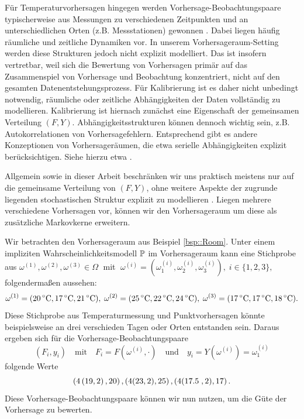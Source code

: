 Für Temperaturvorhersagen hingegen werden Vorhersage-Beobachtungspaare typischerweise aus Messungen zu verschiedenen Zeitpunkten und an unterschiedlichen Orten (z.B. Messstationen) gewonnen \parencite{gneiting2014calibration, vannitsem_statistical_2021}. Dabei liegen häufig räumliche und zeitliche Dynamiken vor. In unserem Vorhersageraum-Setting werden diese Strukturen jedoch nicht explizit modelliert. Das ist insofern vertretbar, weil sich die Bewertung von Vorhersagen primär auf das Zusammenspiel von Vorhersage und Beobachtung konzentriert, nicht auf den gesamten Datenentstehungsprozess. Für Kalibrierung ist es daher nicht unbedingt notwendig, räumliche oder zeitliche Abhängigkeiten der Daten vollständig zu modellieren. Kalibrierung ist hiernach zunächst eine Eigenschaft der gemeinsamen Verteilung  $(F,Y)$. Abhängigkeitsstrukturen können dennoch wichtig sein, z.B. Autokorrelationen von Vorhersagefehlern. Entsprechend gibt es andere Konzeptionen von Vorhersageräumen, die etwa serielle Abhängigkeiten explizit berücksichtigen. Siehe hierzu etwa \textcite[Definition 2.2]{strahl2017cross}. 

Allgemein sowie in dieser Arbeit beschränken wir uns praktisch meistens nur auf die gemeinsame Verteilung von $(F,Y)$, ohne weitere Aspekte der zugrunde liegenden stochastischen Struktur explizit zu modellieren \parencite{gneitingCombining2013}. Liegen mehrere verschiedene Vorhersagen vor, können wir den Vorhersageraum um diese als zusätzliche Markovkerne erweitern.


\begin{bsp}
Wir betrachten den Vorhersageraum aus Beispiel \ref{bsp::Room}. Unter einem impliziten Wahrscheinlichkeitsmodell $\mathbb{P}$ im Vorhersageraum kann eine Stichprobe aus $\omega^{(1)}, \omega^{(2)}, \omega^{(3)} \in \Omega \;$ mit $\;\omega^{(i)} = (\omega_1^{(i)}, \omega_2^{(i)}, \omega_3^{(i)}),\; i \in \{1,2,3\},$ folgendermaßen aussehen:
\[
\omega^{(1)} = (20\,^\circ\mathrm{C}, 17\,^\circ\mathrm{C}, 21\,^\circ\mathrm{C}), 
\;\omega^{(2)} = (25\,^\circ\mathrm{C}, 22\,^\circ\mathrm{C}, 24\,^\circ\mathrm{C}),
\;\omega^{(3)} = (17\,^\circ\mathrm{C}, 17\,^\circ\mathrm{C}, 18\,^\circ\mathrm{C}).
\]
Diese Stichprobe aus Temperaturmessung und Punktvorhersagen könnte beispielsweise an drei verschieden Tagen oder Orten entstanden sein. Daraus ergeben sich für die Vorhersage-Beobachtungspaare
\[
(F_i,y_i) \quad  \text{mit} \quad F_i=F(\omega^{(i)},\cdot)  \quad \text{und} \quad y_i = Y(\omega^{(i)})= \omega_1^{(i)}
\]
folgende Werte
\[
\left(4\left(19,2\right),20\right),
\left(4(23,2),25\right),
\left(4(17.5\;,2),17\right). 
\]
Diese Vorhersage-Beobachtungspaare können wir nun nutzen, um die Güte der Vorhersage zu bewerten.
\end{bsp}{}



